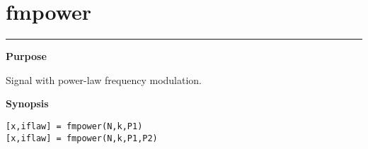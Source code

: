 


\section*{\hspace*{-1.6cm} fmpower}

\vspace*{-.4cm}
\hspace*{-1.6cm}\rule[0in]{16.5cm}{.02cm}
\vspace*{.2cm}



{\bf \large \sf Purpose}\\
\hspace*{1.5cm}
\begin{minipage}[t]{13.5cm}
Signal with power-law frequency modulation.
\end{minipage}
\vspace*{.5cm}


{\bf \large \sf Synopsis}\\
\hspace*{1.5cm}
\begin{minipage}[t]{13.5cm}
\begin{verbatim}
[x,iflaw] = fmpower(N,k,P1)
[x,iflaw] = fmpower(N,k,P1,P2)
\end{verbatim}
\end{minipage}
\vspace*{.5cm}


